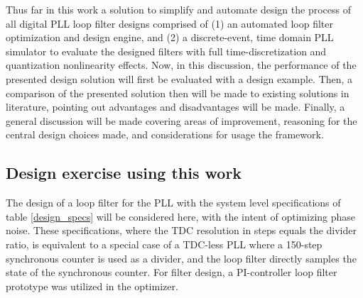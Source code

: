 Thus far in this work a solution to simplify and automate design the process of all digital PLL loop filter designs comprised of (1) an automated loop filter optimization and design engine, and (2) a discrete-event, time domain PLL simulator to evaluate the designed filters with full time-discretization and quantization nonlinearity effects. Now, in this discussion, the performance of the presented design solution will first be evaluated with a design example. Then, a comparison of the presented solution then will be made to existing solutions in literature, pointing out advantages and disadvantages will be made. Finally, a general discussion will be made covering areas of improvement, reasoning for the central design choices made, and considerations for usage the framework.

\subsection{Design exercise using this work}
The design of a loop filter for the PLL with the system level specifications of table \ref{design_specs} will be considered here, with the intent of optimizing phase noise. These specifications, where the TDC resolution in steps equals the divider ratio, is equivalent to a special case of a TDC-less PLL where a 150-step synchronous counter is used as a divider, and the loop filter directly samples the state of the synchronous counter. For filter design, a PI-controller loop filter prototype was utilized in the optimizer.

